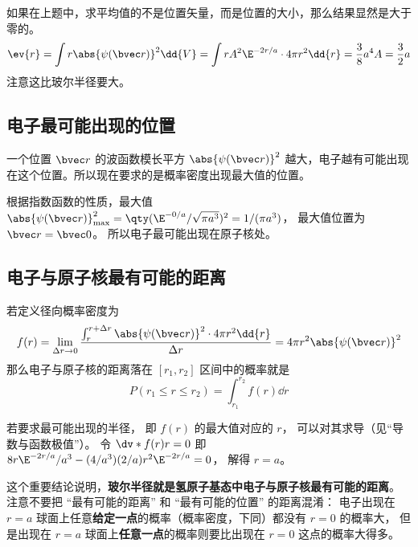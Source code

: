 如果在上题中，求平均值的不是位置矢量，而是位置的大小，那么结果显然是大于零的。
\begin{equation}
\ev{r} = \int r \abs{\psi (\bvec r)}^2 \dd{V} = \int r A^2 \E^{-2r/a} \cdot 4\pi r^2 \dd{r} = \frac{3}{8} a^4 A = \frac{3}{2}a
\end{equation}
注意这比玻尔半径要大。

\subsection{电子最可能出现的位置}

一个位置 $\bvec r$ 的波函数模长平方 $\abs{\psi(\bvec r)}^2$ 越大，电子越有可能出现在这个位置。所以现在要求的是概率密度出现最大值的位置。
 
根据指数函数的性质，最大值 $\abs{\psi (\bvec r)}_{\max}^2 = \qty( \E^{-0/a}/\sqrt{\pi a^3})^2 = 1/(\pi a^3)$， 最大值位置为 $\bvec r = \bvec 0$。 所以电子最可能出现在原子核处。

\subsection{电子与原子核最有可能的距离}
若定义径向概率密度为
\begin{equation}\label{eq_HWF0_1}
f(r) = \lim_{\Delta r \to 0} \frac{\int_r^{r + \Delta r} {\abs{\psi (\bvec r)}}^2 \cdot 4\pi r^2 \dd{r} }{\Delta r} = 4\pi r^2 \abs{\psi(\bvec r)}^2
\end{equation}
那么电子与原子核的距离落在 $[r_1, r_2]$ 区间中的概率就是
\begin{equation}
P(r_1 \le r \le r_2) = \int_{r_1}^{r_2} f(r) \dd{r}
\end{equation}

若要求最可能出现的半径， 即 $f(r)$ 的最大值对应的 $r$， 可以对其求导（见“导数与函数极值”）。 令 $\dv*{f(r)}{r} = 0$ 即 $8 r \E^{-2r/a}/a^3 - (4/a^3)(2/a)r^2 \E^{-2r/a} = 0$， 解得 $r = a$。 
 
这个重要结论说明，\textbf{玻尔半径就是氢原子基态中电子与原子核最有可能的距离}。 注意不要把 “最有可能的距离” 和 “最有可能的位置” 的距离混淆： 电子出现在 $r = a$ 球面上任意\textbf{给定一点}的概率（概率密度，下同）都没有 $r = 0$ 的概率大， 但是出现在 $r = a$ 球面上\textbf{任意一点}的概率则要比出现在 $r = 0$ 这点的概率大得多。
